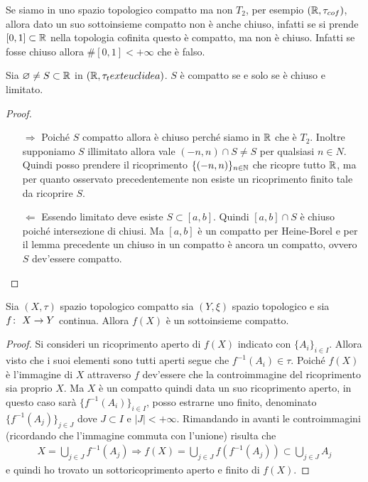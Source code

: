\begin{remark}
	Se siamo in uno spazio topologico compatto ma non $T_2$, per esempio $(\mathbb{R}, \tau_{cof})$, allora dato un suo sottoinsieme compatto non è anche chiuso, infatti se si prende $\left[0,1\right] \subset \mathbb{R}$ nella topologia cofinita questo è compatto, ma non è chiuso. Infatti se fosse chiuso allora $\#\left[0,1\right] < +\infty$ che è falso.
\end{remark}

\begin{corollary}
	Sia $\varnothing \neq S \subset \mathbb{R}$ in $(\mathbb{R}, \tau_text{euclidea})$. $S$ è compatto se e solo se è chiuso e limitato. 
\end{corollary} 
\begin{proof}
	\begin{enumerate}
		\item[$\Rightarrow$] Poiché $S$ compatto allora è chiuso perché siamo in $\mathbb{R}$ che è $T_2$. Inoltre supponiamo $S$ illimitato allora vale $(-n, n) \cap S \neq S$ per qualsiasi $n \in N$. Quindi posso prendere il ricoprimento $\{(-n,n)\}_{n\in \mathbb{N}}$ che ricopre tutto $\mathbb{R}$, ma per quanto osservato precedentemente non esiste un ricoprimento finito tale da ricoprire $S$.
		\item[$\Leftarrow$] Essendo limitato deve esiste $S\subset \left[a,b\right]$. Quindi $\left[a,b\right] \cap S$ è chiuso poiché intersezione di chiusi. Ma $\left[a,b\right]$ è un compatto per Heine-Borel e per il lemma precedente un chiuso in un compatto è ancora un compatto, ovvero $S$ dev'essere compatto.
	\end{enumerate}	
\end{proof}

\begin{theorem}
	Sia $(X, \tau)$ spazio topologico compatto sia $(Y, \xi)$ spazio topologico e sia $f \colon\ X \rightarrow Y$ continua. Allora $f(X)$ è un sottoinsieme compatto. 
\end{theorem} 
\begin{proof}
	Si consideri un ricoprimento aperto di $f(X)$ indicato con $\{A_i\}_{i \in I}$. Allora visto che i suoi elementi sono tutti aperti segue che $f^{-1}(A_i) \in \tau$. Poiché $f(X)$ è l'immagine di $X$ attraverso $f$ dev'essere che la controimmagine del ricoprimento sia proprio $X$. Ma $X$ è un compatto quindi data un suo ricoprimento aperto, in questo caso sarà $\{f^{-1}(A_i)\}_{i \in I}$, posso estrarne uno finito, denominato $\{f^{-1}(A_j)\}_{j \in J}$ dove $J \subset I$ e $|J| < +\infty$. Rimandando in avanti le controimmagini (ricordando che l'immagine commuta con l'unione) risulta che
	\begin{equation}
	\begin{aligned}
		X = \bigcup_{j \in J} f^{-1}(A_j) \Longrightarrow f(X) = \bigcup_{j \in J} f(f^{-1}(A_j)) \subset \bigcup_{j \in J} A_j
	\end{aligned}
	\end{equation}
	e quindi ho trovato un sottoricoprimento aperto e finito di $f(X)$.
\end{proof}

